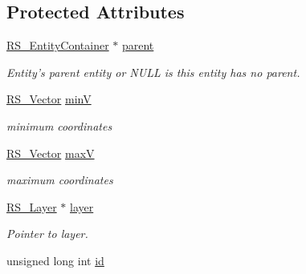 \subsection*{Protected Attributes}
\begin{DoxyCompactItemize}
\item 
\hypertarget{classRS__Entity_a80358a8d2fc6739a516a278dc500b49f}{\hyperlink{classRS__EntityContainer}{R\-S\-\_\-\-Entity\-Container} $\ast$ \hyperlink{classRS__Entity_a80358a8d2fc6739a516a278dc500b49f}{parent}}\label{classRS__Entity_a80358a8d2fc6739a516a278dc500b49f}

\begin{DoxyCompactList}\small\item\em Entity's parent entity or N\-U\-L\-L is this entity has no parent. \end{DoxyCompactList}\item 
\hypertarget{classRS__Entity_a4c88d3b694aac7189c05df009b48ee72}{\hyperlink{classRS__Vector}{R\-S\-\_\-\-Vector} \hyperlink{classRS__Entity_a4c88d3b694aac7189c05df009b48ee72}{min\-V}}\label{classRS__Entity_a4c88d3b694aac7189c05df009b48ee72}

\begin{DoxyCompactList}\small\item\em minimum coordinates \end{DoxyCompactList}\item 
\hypertarget{classRS__Entity_a43e0b8304f11fa91e079f0dcaad9f73a}{\hyperlink{classRS__Vector}{R\-S\-\_\-\-Vector} \hyperlink{classRS__Entity_a43e0b8304f11fa91e079f0dcaad9f73a}{max\-V}}\label{classRS__Entity_a43e0b8304f11fa91e079f0dcaad9f73a}

\begin{DoxyCompactList}\small\item\em maximum coordinates \end{DoxyCompactList}\item 
\hypertarget{classRS__Entity_a6e738a0a081f97b9923787777e639b27}{\hyperlink{classRS__Layer}{R\-S\-\_\-\-Layer} $\ast$ \hyperlink{classRS__Entity_a6e738a0a081f97b9923787777e639b27}{layer}}\label{classRS__Entity_a6e738a0a081f97b9923787777e639b27}

\begin{DoxyCompactList}\small\item\em Pointer to layer. \end{DoxyCompactList}\item 
\hypertarget{classRS__Entity_a491c2b6d300c8dcb8fad96abf2eb547d}{unsigned long int \hyperlink{classRS__Entity_a491c2b6d300c8dcb8fad96abf2eb547d}{id}}\label{classRS__Entity_a491c2b6d300c8dcb8fad96abf2eb547d}


\end{DoxyCompactItemize}
